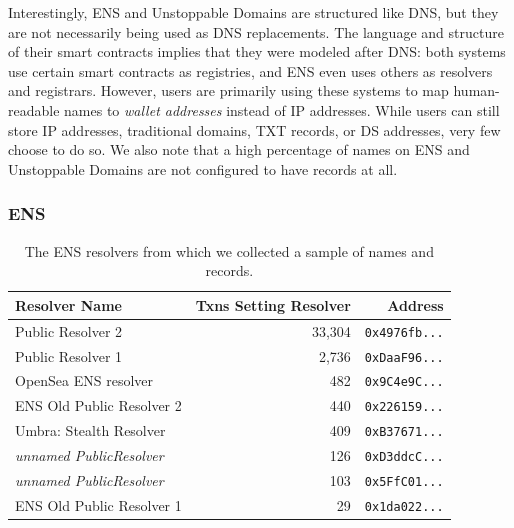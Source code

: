 Interestingly, ENS and Unstoppable Domains are structured 
like DNS, but they are not necessarily being used as DNS 
replacements. The language and structure of their smart 
contracts implies that they were 
modeled after DNS: both systems use certain smart contracts 
as registries, and ENS even uses others as resolvers and 
registrars. However, users are primarily using these systems 
to map human-readable names to \emph{wallet addresses} 
instead of IP addresses. While users can still store IP 
addresses, traditional domains, TXT records, or DS addresses, 
very few choose to do so.  
We also 
note that a high percentage of names on ENS and Unstoppable Domains are not 
configured to have records at all. 

\subsubsection{ENS}

\begin{table}
	\begin{tabular}{lrr}
		\toprule
		Resolver Name & Txns Setting Resolver & Address \\
		\midrule 
		Public Resolver 2 & 33,304 & \texttt{0x4976fb...} \\
		Public Resolver 1 & 2,736 & \texttt{0xDaaF96...} \\
		OpenSea ENS resolver & 482 & \texttt{0x9C4e9C...} \\
		ENS Old Public Resolver 2 & 440	& \texttt{0x226159...} \\
		Umbra: Stealth Resolver & 409 & \texttt{0xB37671...} \\
		\textit{unnamed PublicResolver} & 126 & \texttt{0xD3ddcC...} \\
		\textit{unnamed PublicResolver} & 103 & \texttt{0x5FfC01...} \\
		ENS Old Public Resolver 1 & 29 & \texttt{0x1da022...} \\
		\bottomrule
	\end{tabular}
	\caption{The ENS resolvers from which we collected a 
	sample of names and records.}
	\label{tab:ens_resolvers}
\end{table}

